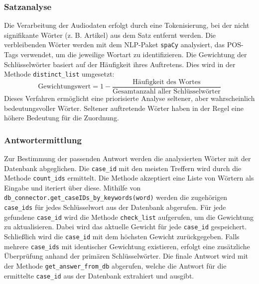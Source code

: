 \subsubsection{Satzanalyse}
Die Verarbeitung der Audiodaten erfolgt durch eine Tokenisierung, bei der nicht signifikante Wörter (z. B. Artikel) aus dem Satz entfernt werden. Die verbleibenden Wörter werden mit dem NLP-Paket \texttt{spaCy} analysiert, das \ac{POS-Tags} verwendet, um die jeweilige Wortart zu identifizieren.
Die Gewichtung der Schlüsselwörter basiert auf der Häufigkeit ihres Auftretens. Dies wird in der Methode \texttt{distinct\_list} umgesetzt:
\[
\text{Gewichtungswert} = 1 - \frac{\text{Häufigkeit des Wortes}}{\text{Gesamtanzahl aller Schlüsselwörter}}
\]
Dieses Verfahren ermöglicht eine priorisierte Analyse seltener, aber wahrscheinlich bedeutungsvoller Wörter. Seltener auftretende Wörter haben in der Regel eine höhere Bedeutung für die Zuordnung.

\subsubsection{Antwortermittlung}
Zur Bestimmung der passenden Antwort werden die analysierten Wörter mit der Datenbank abgeglichen. Die \texttt{case\_id} mit den meisten Treffern wird durch die Methode \texttt{count\_ids} ermittelt. 
Die Methode akzeptiert eine Liste von Wörtern als Eingabe und iteriert über diese. Mithilfe von \texttt{db\_connector.get\_caseIDs\_by\_keywords(word)} werden die zugehörigen \texttt{case\_ids} für jedes Schlüsselwort aus der Datenbank abgerufen. Für jede gefundene \texttt{case\_id} wird die Methode \texttt{check\_list} aufgerufen, um die Gewichtung zu aktualisieren. Dabei wird das aktuelle Gewicht für jede \texttt{case\_id} gespeichert. Schließlich wird die \texttt{case\_id} mit dem höchsten Gewicht zurückgegeben.
Falls mehrere \texttt{case\_ids} mit identischer Gewichtung existieren, erfolgt eine zusätzliche Überprüfung anhand der primären Schlüsselwörter. Die finale Antwort wird mit der Methode \texttt{get\_answer\_from\_db} abgerufen, welche die Antwort für die ermittelte \texttt{case\_id} aus der Datenbank extrahiert und ausgibt.

